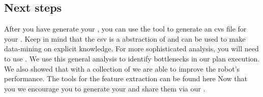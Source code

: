 \subsection{Next steps}
After you have generate your \neem, you can use the tool  to generate an cvs file for your \neem.
Keep in mind that the csv is a abstraction of \neemnar and can be used to make data-mining on explicit knowledge.
For more sophisticated analysis, you will need to use \knowrob. 
We use this general analysis to identify bottlenecks in our plan execution.
We also showed that with a collection of \neems we are able to improve the robot's performance.
The tools for the feature extraction can be found here 
Now that you we encourage you to generate your \neems and share them via our \neemhub.



